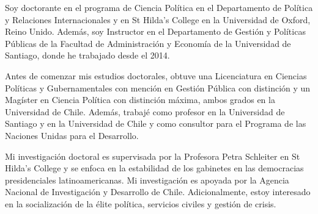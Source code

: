 




\vspace{3mm}

\begin{cvparagraph}

Soy doctorante en el programa de Ciencia Política en el Departamento de Política y Relaciones Internacionales y en St Hilda's College en la Universidad de Oxford, Reino Unido. Además, soy Instructor en el Departamento de Gestión y Políticas Públicas de la Facultad de Administración y Economía de la Universidad de Santiago, donde he trabajado desde el 2014.

Antes de comenzar mis estudios doctorales, obtuve una Licenciatura en Ciencias Políticas y Gubernamentales con mención en Gestión Pública con distinción y un Magíster en Ciencia Política con distinción máxima, ambos grados en la Universidad de Chile. Además, trabajé como profesor en la Universidad de Santiago y en la Universidad de Chile y como consultor para el Programa de las Naciones Unidas para el Desarrollo.

Mi investigación doctoral es supervisada por la Profesora Petra Schleiter en St Hilda's College y se enfoca en la estabilidad de los gabinetes en las democracias presidenciales latinoamericanas. Mi investigación es apoyada por la Agencia Nacional de Investigación y Desarrollo de Chile. Adicionalmente, estoy interesado en la socialización de la élite política, servicios civiles y gestión de crisis.
\vspace{1mm}
\end{cvparagraph}
